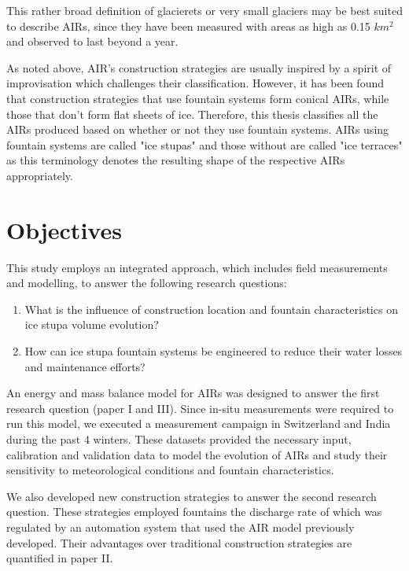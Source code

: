 This rather broad definition of glacierets or very small glaciers may be best suited to describe AIRs, since
they have been measured with areas as high as 0.15 $km^2$ and observed to last beyond a year.

As noted above, AIR's construction strategies are usually inspired by a spirit of improvisation which challenges their
classification. However, it has been found that construction strategies that use fountain systems form conical
\ac{AIRs}, while those that don't form flat sheets of ice. Therefore, this thesis classifies all the \ac{AIRs} produced
based on whether or not they use fountain systems. \ac{AIRs} using fountain systems are called "ice stupas" and those
without are called "ice terraces" as this terminology denotes the resulting shape of the respective \ac{AIRs}
appropriately.

\section{Objectives}

This study employs an integrated approach, which includes field measurements and modelling, to answer the
following research questions: 

\begin{enumerate}

\item What is the influence of construction location and fountain characteristics on ice stupa volume evolution? 

\item How can ice stupa fountain systems be engineered to reduce their water losses and maintenance efforts?

\end{enumerate}

An energy and mass balance model for \ac{AIRs} was designed to answer the first research question
(paper I and III). Since in-situ measurements were required to run this model, we executed a measurement campaign
in Switzerland and India during the past 4 winters. These datasets provided the necessary input, calibration and
validation data to model the evolution of \ac{AIRs} and study their sensitivity to meteorological conditions and
fountain characteristics. 

We also developed new construction strategies to answer the second research question. These
strategies employed fountains the discharge rate of which was regulated by an automation system that used the AIR model
previously developed. Their advantages over traditional construction strategies are quantified in paper II.

